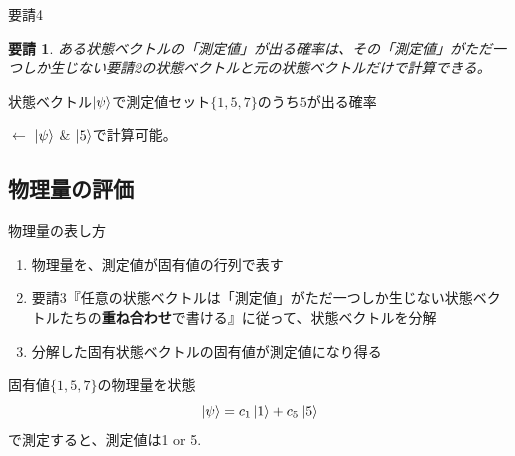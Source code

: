 \documentclass[dvipdfm]{beamer}
\newtheorem*{requirement}{要請}
\begin{document}
\begin{frame}{要請4}
    \begin{requirement}
        ある状態ベクトルの「測定値」が出る確率は、その「測定値」がただ一つしか生じない要請2の状態ベクトルと元の状態ベクトルだけで計算できる。
    \end{requirement}
    状態ベクトル$\ket{\psi}$で測定値セット$\{1, 5, 7\}$のうち$5$が出る確率

    $\longleftarrow$
    $\ket{\psi}$ \& $\ket{5}$で計算可能。
\end{frame}


\subsection{物理量の評価}

\begin{frame}{物理量の表し方}
    \begin{enumerate}
        \item 物理量を、測定値が固有値の行列で表す
        \item 要請3『任意の状態ベクトルは「測定値」がただ一つしか生じない状態ベクトルたちの\textbf{重ね合わせ}で書ける』に従って、状態ベクトルを分解
        \item 分解した固有状態ベクトルの固有値が測定値になり得る
    \end{enumerate}
    \begin{example}
        固有値$\{1,5,7\}$の物理量を状態
        \begin{equation*}
            \ket{\psi}
            =
            c_1\ket{1}+c_5\ket{5}
        \end{equation*}
        で測定すると、測定値は1 or 5.
    \end{example}
\end{frame}
\end{document}
